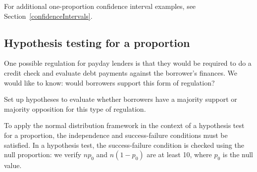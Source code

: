 \onepropconfintsummary{}

\noindent%
For additional one-proportion confidence interval examples,
see Section~\ref{confidenceIntervals}.


\subsection{Hypothesis testing for a proportion}
\label{htForPropSection}

\newcommand{\paydayCCPerc}{51\%}
\newcommand{\paydayCCProp}{0.51}
\newcommand{\paydayCCSE}{0.017}
\newcommand{\paydayCCSEPerc}{1.7\%}
\newcommand{\paydayCCZ}{0.59}
\newcommand{\paydayCCOneTail}{0.2776}
\newcommand{\paydayCCPvalue}{0.5552}

One possible regulation for payday lenders is that they
would be required to do a credit check and evaluate debt
payments against the borrower's finances.
We would like to know: would borrowers support this form
of regulation?


\begin{exercisewrap}
\begin{nexercise}
\label{paydayCC_hypotheses_gp}%
Set up hypotheses to evaluate whether borrowers
have a majority support or majority opposition for this
type of regulation.\footnotemark
\end{nexercise}
\end{exercisewrap}

To apply the normal distribution framework in the context
of a hypothesis test for a proportion, the independence
and success-failure conditions must be satisfied.
In a hypothesis test, the success-failure condition is
checked using the null proportion:
we verify $np_0$ and $n(1-p_0)$ are at least 10,
where $p_0$ is the null value.

